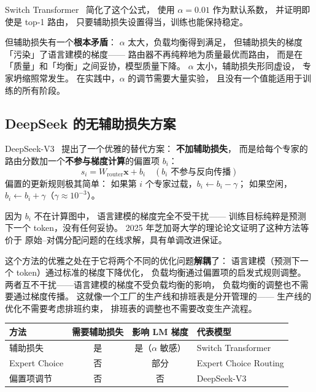 Switch Transformer~\cite{fedus2022switch} 简化了这个公式，
使用 $\alpha = 0.01$ 作为默认系数，
并证明即使是 top-1 路由，
只要辅助损失设置得当，训练也能保持稳定。

但辅助损失有一个\textbf{根本矛盾}：
$\alpha$ 太大，负载均衡得到满足，
但辅助损失的梯度「污染」了语言建模的梯度——
路由器不再纯粹地为质量最优而路由，
而是在「质量」和「均衡」之间妥协，模型质量下降。
$\alpha$ 太小，辅助损失形同虚设，
专家坍缩照常发生。
在实践中，$\alpha$ 的调节需要大量实验，
且没有一个值能适用于训练的所有阶段。

\subsection{DeepSeek 的无辅助损失方案}

DeepSeek-V3~\cite{deepseekv3} 提出了一个优雅的替代方案：
\textbf{不加辅助损失}，
而是给每个专家的路由分数加一个\textbf{不参与梯度计算}的偏置项 $b_i$：
\begin{equation}
  s_i = W_{\mathrm{router}} \mathbf{x} + b_i
  \quad (\text{$b_i$ 不参与反向传播})
\end{equation}
偏置的更新规则极其简单：
如果第 $i$ 个专家过载，$b_i \leftarrow b_i - \gamma$；
如果空闲，$b_i \leftarrow b_i + \gamma$（$\gamma \approx 10^{-3}$）。

因为 $b_i$ 不在计算图中，
语言建模的梯度完全不受干扰——
训练目标纯粹是预测下一个 token，没有任何妥协。
2025 年芝加哥大学的理论论文证明了这种方法等价于
原始--对偶分配问题的在线求解，具有单调改进保证。

这个方法的优雅之处在于它将两个不同的优化问题\textbf{解耦}了：
语言建模（预测下一个 token）通过标准的梯度下降优化，
负载均衡通过偏置项的启发式规则调整。
两者互不干扰——语言建模的梯度不受负载均衡的影响，
负载均衡的调整也不需要通过梯度传播。
这就像一个工厂的生产线和排班表是分开管理的——
生产线的优化不需要考虑排班约束，
排班表的调整也不需要改变生产流程。

\begin{keybox}[负载均衡方法对比]
\begin{center}
\begin{tabular}{lccl}
  \hline
  \textbf{方法} & \textbf{需要辅助损失} & \textbf{影响 LM 梯度}
  & \textbf{代表模型} \\
  \hline
  辅助损失 & 是 & 是（$\alpha$ 敏感） & Switch Transformer \\
  Expert Choice & 否 & 部分 & Expert Choice Routing \\
  偏置项调节 & 否 & 否 & DeepSeek-V3 \\
  \hline
\end{tabular}
\end{center}
\end{keybox}


